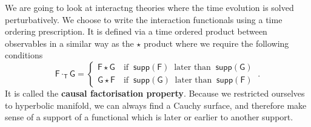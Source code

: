 \documentclass[12pt]{book}
\newcommand{\supp}{\mathsf{supp}}
\newcommand{\Fsf}{\mathsf{F}}
\newcommand{\Gsf}{\mathsf{G}}
\newcommand{\Tsf}{\mathsf{T}}
\theoremstyle{break}
\begin{document}


We are going to look at interactng theories where the time evolution is solved perturbatively. We choose to write the interaction functionals using a time ordering prescription. It is defined via a time ordered product between observables in a similar way as the $\star$ product where we require the following conditions
%
\begin{equation}
\Fsf \cdot_\Tsf \Gsf = 
\left\{
\begin{array}{ll}
\Fsf \star \Gsf \quad \mbox{if } \ \supp(\Fsf) \ \mbox{ later than  } \ \supp(\Gsf)  \\
\Gsf \star \Fsf \quad \mbox{if } \ \supp(\Gsf) \ \mbox{ later than  } \ \supp(\Fsf) 
\end{array}
\right. \ .
\label{eq:causal_factorization}
\end{equation}
%
It is called the \textbf{causal factorisation property}. Because we restricted ourselves to hyperbolic manifold, we can always find a Cauchy surface, and therefore make sense of a support of a functional which is later or earlier to another support. 


\end{document}
